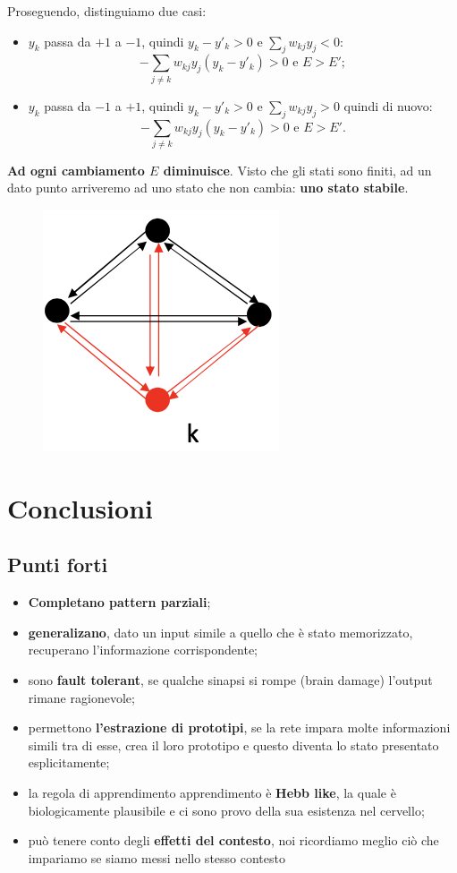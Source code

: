 Proseguendo, distinguiamo due casi:
\begin{itemize}
    \item $y_k$ passa da $+1$ a $-1$, quindi $y_k-y'_k>0$ e $\sum_jw_{kj}y_j<0$:
        \begin{equation}
            -\sum_{j\neq k}w_{kj}y_j(y_k-y'_k)>0\text{ e }E>E';
        \end{equation}
    \item $y_k$ passa da $-1$ a $+1$, quindi $y_k-y'_k>0$ e $\sum_jw_{kj}y_j>0$ quindi di nuovo:
        \begin{equation}
            -\sum_{j\neq k}w_{kj}y_j(y_k-y'_k)>0\text{ e }E>E'.
        \end{equation}
\end{itemize}
\textbf{Ad ogni cambiamento $E$ diminuisce}. Visto che gli stati sono finiti, ad un dato punto arriveremo ad uno stato che non cambia: \textbf{uno stato stabile}.
\begin{figure}[!h]
    \includegraphics[scale=2]{images/hopfield_networks/conv_theorem.png}
    \centering
\end{figure}
\newpage
\section{Conclusioni}
\subsection{Punti forti}
\begin{itemize}
    \item \textbf{Completano pattern parziali};
    \item  \textbf{generalizano}, dato un input simile a quello che è stato memorizzato, recuperano l'informazione corrispondente;
    \item sono \textbf{fault tolerant}, se qualche sinapsi si rompe (brain damage) l'output rimane ragionevole;
    \item permettono \textbf{l'estrazione di prototipi}, se la rete impara molte informazioni simili tra di esse, crea il loro prototipo e questo diventa lo stato presentato esplicitamente;
    \item la regola di apprendimento apprendimento è \textbf{Hebb like}, la quale è biologicamente plausibile e ci sono provo della sua esistenza nel cervello;
    \item può tenere conto degli \textbf{effetti del contesto}, noi ricordiamo meglio ciò che impariamo se siamo messi nello stesso contesto
\end{itemize}
